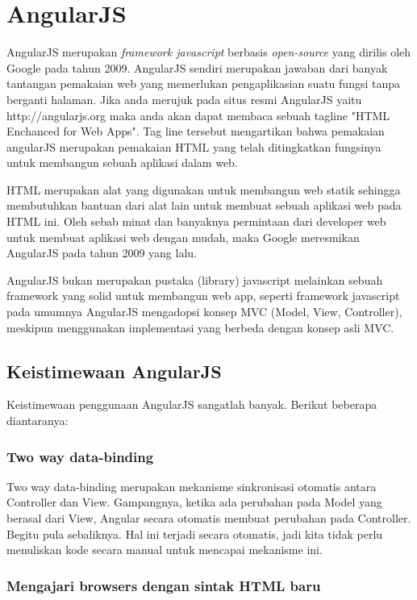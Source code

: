 \section{AngularJS}
\label{sec: angularJS}
	
	AngularJS merupakan \textit{framework javascript} berbasis \textit{open-source} yang dirilis oleh Google pada tahun 2009. AngularJS sendiri merupakan jawaban dari banyak tantangan pemakaian web yang memerlukan pengaplikasian suatu fungsi tanpa berganti halaman. Jika anda merujuk pada situs resmi AngularJS yaitu http://angularjs.org maka anda akan dapat membaca sebuah tagline "HTML Enchanced for Web Apps". Tag line tersebut mengartikan bahwa pemakaian angularJS merupakan pemakaian HTML yang telah ditingkatkan fungsinya untuk membangun sebuah aplikasi dalam web.
	
	HTML merupakan alat yang digunakan untuk membangun web statik sehingga membutuhkan bantuan dari alat lain untuk membuat sebuah aplikasi web pada HTML ini. Oleh sebab minat dan banyaknya permintaan dari developer web untuk membuat aplikasi web dengan mudah, maka Google meresmikan AngularJS pada tahun 2009 yang lalu.
	
	AngularJS bukan merupakan pustaka (library) javascript melainkan sebuah framework yang solid untuk membangun web app, seperti framework javascript pada umumnya AngularJS mengadopsi konsep MVC (Model, View, Controller), meskipun menggunakan implementasi yang berbeda dengan konsep asli MVC.
	
\subsection{Keistimewaan AngularJS}
\label{sub: keistimewaanAngularJS}
	Keistimewaan penggunaan AngularJS sangatlah banyak. Berikut beberapa diantaranya:
	
\subsubsection{Two way data-binding}
\label{sub: twoWayDataBinding}

	Two way data-binding merupakan mekanisme sinkronisasi otomatis antara Controller dan View. Gampangnya, ketika ada perubahan pada Model yang berasal dari View, Angular secara otomatis membuat perubahan pada Controller. Begitu pula sebaliknya. Hal ini terjadi secara otomatis, jadi kita tidak perlu menuliskan kode secara manual untuk mencapai mekanisme ini.

\subsubsection{Mengajari browsers dengan sintak HTML baru}
\label{subsub: mengajariBrowsersDenganSintakHTMLBaru}

